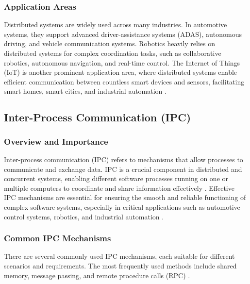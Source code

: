 \subsubsection{Application Areas}

Distributed systems are widely used across many industries. In automotive systems, they support advanced driver-assistance systems (ADAS), autonomous driving, and vehicle communication systems. Robotics heavily relies on distributed systems for complex coordination tasks, such as collaborative robotics, autonomous navigation, and real-time control. The Internet of Things (IoT) is another prominent application area, where distributed systems enable efficient communication between countless smart devices and sensors, facilitating smart homes, smart cities, and industrial automation \cite{tanenbaum2017,coulouris2012}.





\subsection{Inter-Process Communication (IPC)}

\subsubsection{Overview and Importance}

Inter-process communication (IPC) refers to mechanisms that allow processes to communicate and exchange data. IPC is a crucial component in distributed and concurrent systems, enabling different software processes running on one or multiple computers to coordinate and share information effectively \cite{stallings2018}. Effective IPC mechanisms are essential for ensuring the smooth and reliable functioning of complex software systems, especially in critical applications such as automotive control systems, robotics, and industrial automation \cite{tanenbaum2015}.

\subsubsection{Common IPC Mechanisms}

There are several commonly used IPC mechanisms, each suitable for different scenarios and requirements. The most frequently used methods include shared memory, message passing, and remote procedure calls (RPC) \cite{stallings2018,tanenbaum2015}.
\\
\\

